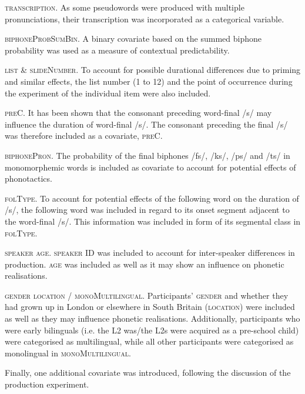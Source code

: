 \textsc{transcription}. As some pseudowords were produced with multiple pronunciations, their transcription was incorporated as a categorical variable.

\textsc{biphoneProbSumBin}. A binary covariate based on the summed biphone probability was used as a measure of contextual predictability.

\textsc{list} \& \textsc{slideNumber}. To account for possible durational differences due to priming and similar effects, the list number (1 to 12) and the point of occurrence during the experiment of the individual item were also included.

\textsc{preC}. It has been shown that the consonant preceding word-final /s/ may influence the duration of word-final /s/. The consonant preceding the final /s/ was therefore included as a covariate, \textsc{preC}.

\textsc{biphonePron}. The probability of the final biphones /fs/, /ks/, /ps/ and /ts/ in monomorphemic words is included as covariate to account for potential effects of phonotactics.

\textsc{folType}. To account for potential effects of the following word on the duration of /s/, the following word was included in regard to its onset segment adjacent to the word-final /s/. This information was included in form of its segmental class in \textsc{folType}.

\textsc{speaker} \/ \textsc{age}. \textsc{speaker} ID was included to account for inter-speaker differences in production. \textsc{age} was included as well as it may show an influence on phonetic realisations.

\textsc{gender} \/ \textsc{location} / \textsc{monoMultilingual}. Participants’ \textsc{gender} and whether they had grown up in London or elsewhere in South Britain (\textsc{location}) were included as well as they may influence phonetic realisations. Additionally, participants who were early bilinguals (i.e. the L2 was/the L2s were acquired as a pre-school child) were categorised as multilingual, while all other participants were categorised as monolingual in \textsc{monoMultilingual}.

Finally, one additional covariate was introduced, following the discussion of the production experiment.

